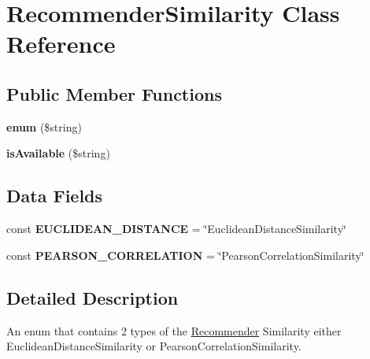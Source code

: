 \hypertarget{class_recommender_similarity}{\section{Recommender\+Similarity Class Reference}
\label{class_recommender_similarity}
}
\subsection*{Public Member Functions}
\begin{DoxyCompactItemize}
\item 
\hypertarget{class_recommender_similarity_a7967c6e825979f8b2faefba3d95c3821}{{\bfseries enum} (\$string)}\label{class_recommender_similarity_a7967c6e825979f8b2faefba3d95c3821}

\item 
\hypertarget{class_recommender_similarity_a30537daeb912ea3e348c579c4f930841}{{\bfseries is\+Available} (\$string)}\label{class_recommender_similarity_a30537daeb912ea3e348c579c4f930841}

\end{DoxyCompactItemize}
\subsection*{Data Fields}
\begin{DoxyCompactItemize}
\item 
\hypertarget{class_recommender_similarity_ad5bbd2ff6a9b3c69ed6a35a08ee047b0}{const {\bfseries E\+U\+C\+L\+I\+D\+E\+A\+N\+\_\+\+D\+I\+S\+T\+A\+N\+C\+E} = \char`\"{}Euclidean\+Distance\+Similarity\char`\"{}}\label{class_recommender_similarity_ad5bbd2ff6a9b3c69ed6a35a08ee047b0}

\item 
\hypertarget{class_recommender_similarity_acc92e75b65f4c3fc0cccdffa7ac12cc5}{const {\bfseries P\+E\+A\+R\+S\+O\+N\+\_\+\+C\+O\+R\+R\+E\+L\+A\+T\+I\+O\+N} = \char`\"{}Pearson\+Correlation\+Similarity\char`\"{}}\label{class_recommender_similarity_acc92e75b65f4c3fc0cccdffa7ac12cc5}

\end{DoxyCompactItemize}


\subsection{Detailed Description}
An enum that contains 2 types of the \hyperlink{class_recommender}{Recommender} Similarity either Euclidean\+Distance\+Similarity or Pearson\+Correlation\+Similarity. 